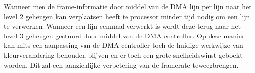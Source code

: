 	\par Wanneer men de frame-informatie door middel van de DMA lijn per lijn naar het level 2 geheugen kan verplaatsen heeft te processor minder tijd nodig om een lijn te verwerken. Wanneer een lijn eenmaal verwerkt is wordt deze terug naar het level 3 geheugen gestuurd door middel van de DMA-controller. Op deze manier kan mits een aanpassing van de DMA-controller toch de huidige werkwijze van kleurverandering behouden blijven en er toch een grote snelheidswinst geboekt worden. Dit zal een aanzienlijke verbetering van de framerate teweegbrengen.
